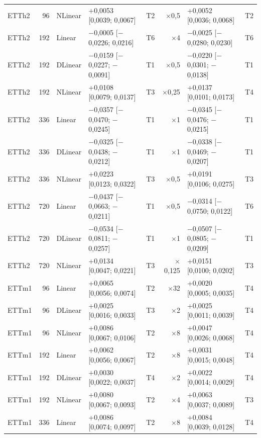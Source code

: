 {\begin{longtable}{@{}lrl l c r l c@{}}
ETTh2 & 96 & NLinear & +0{,}0053 [0{,}0039; 0{,}0067] & T2 & $\times$0{,}5 & +0{,}0052 [0{,}0036; 0{,}0068] & T2 \\
ETTh2 & 192 & Linear & $-$0{,}0005 [$-$0{,}0226; 0{,}0216] & T6 & $\times$4 & $-$0{,}0025 [$-$0{,}0280; 0{,}0230] & T6 \\
ETTh2 & 192 & DLinear & $-$0{,}0159 [$-$0{,}0227; $-$0{,}0091] & T1 & $\times$0{,}5 & $-$0{,}0220 [$-$0{,}0301; $-$0{,}0138] & T1 \\
ETTh2 & 192 & NLinear & +0{,}0108 [0{,}0079; 0{,}0137] & T3 & $\times$0{,}25 & +0{,}0137 [0{,}0101; 0{,}0173] & T4 \\
ETTh2 & 336 & Linear & $-$0{,}0357 [$-$0{,}0470; $-$0{,}0245] & T1 & $\times$1 & $-$0{,}0345 [$-$0{,}0476; $-$0{,}0215] & T1 \\
ETTh2 & 336 & DLinear & $-$0{,}0325 [$-$0{,}0438; $-$0{,}0212] & T1 & $\times$1 & $-$0{,}0338 [$-$0{,}0469; $-$0{,}0207] & T1 \\
ETTh2 & 336 & NLinear & +0{,}0223 [0{,}0123; 0{,}0322] & T3 & $\times$0{,}5 & +0{,}0191 [0{,}0106; 0{,}0275] & T3 \\
ETTh2 & 720 & Linear & $-$0{,}0437 [$-$0{,}0663; $-$0{,}0211] & T1 & $\times$0{,}5 & $-$0{,}0314 [$-$0{,}0750; 0{,}0122] & T6 \\
ETTh2 & 720 & DLinear & $-$0{,}0534 [$-$0{,}0811; $-$0{,}0257] & T1 & $\times$1 & $-$0{,}0507 [$-$0{,}0805; $-$0{,}0209] & T1 \\
ETTh2 & 720 & NLinear & +0{,}0134 [0{,}0047; 0{,}0221] & T3 & $\times$0{,}125 & +0{,}0151 [0{,}0100; 0{,}0202] & T3 \\
\addlinespace[2pt]
ETTm1 & 96 & Linear & +0{,}0065 [0{,}0056; 0{,}0074] & T2 & $\times$32 & +0{,}0020 [0{,}0005; 0{,}0035] & T4 \\
ETTm1 & 96 & DLinear & +0{,}0025 [0{,}0016; 0{,}0033] & T3 & $\times$2 & +0{,}0025 [0{,}0011; 0{,}0039] & T4 \\
ETTm1 & 96 & NLinear & +0{,}0086 [0{,}0067; 0{,}0106] & T2 & $\times$8 & +0{,}0047 [0{,}0026; 0{,}0068] & T4 \\
ETTm1 & 192 & Linear & +0{,}0062 [0{,}0056; 0{,}0067] & T2 & $\times$8 & +0{,}0031 [0{,}0015; 0{,}0048] & T4 \\
ETTm1 & 192 & DLinear & +0{,}0030 [0{,}0022; 0{,}0037] & T4 & $\times$2 & +0{,}0022 [0{,}0014; 0{,}0029] & T4 \\
ETTm1 & 192 & NLinear & +0{,}0080 [0{,}0067; 0{,}0093] & T2 & $\times$4 & +0{,}0063 [0{,}0037; 0{,}0089] & T3 \\
ETTm1 & 336 & Linear & +0{,}0086 [0{,}0074; 0{,}0097] & T2 & $\times$8 & +0{,}0084 [0{,}0039; 0{,}0128] & T4 \\

\end{longtable}}

